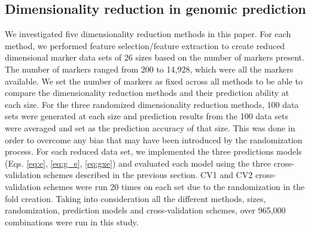 \subsection{Dimensionality reduction in genomic prediction}

We investigated five dimensionality reduction methods in this paper. For each method, we performed feature selection/feature extraction to create reduced dimensional marker data sets of 26 sizes based on the number of markers present. The number of markers ranged from 200 to 14,928, which were all the markers available. We set the number of markers as fixed across all methods to be able to compare the dimensionality reduction methods and their prediction ability at each size. For the three randomized dimensionality reduction methods, 100 data sets were generated at each size and prediction results from the 100 data sets were averaged and set as the prediction accuracy of that size. This was done in order to overcome any bias that may have been introduced by the randomization process. For each reduced data set, we implemented the three predictions models (Eqs. \ref{eq:e}, \ref{eq:g_e}, \ref{eq:gxe}) and evaluated each model using the three cross-validation schemes described in the previous section. CV1 and CV2 cross-validation schemes were run 20 times on each set due to the randomization in the fold creation. Taking into consideration all the different methods, sizes, randomization, prediction models and cross-validation schemes, over 965,000 combinations were run in this study. 

